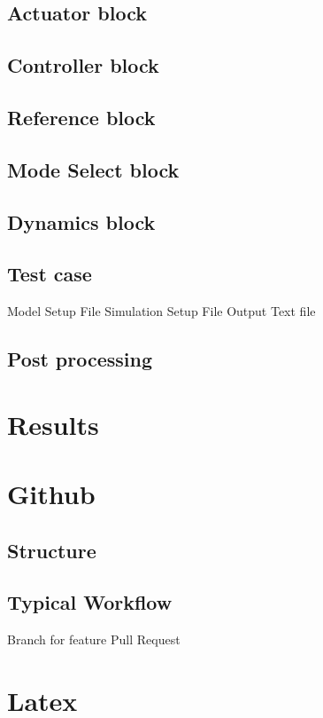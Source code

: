 \subsection{Actuator block} %
\subsection{Controller block} %
\subsection{Reference block} %
\subsection{Mode Select block} %
\subsection{Dynamics block}
\subsection{Test case}
Model Setup File
Simulation Setup File
Output Text file

\subsection{Post processing}


\section{Results}


\appendix
\section{Github}
\subsection{Structure}
\subsection{Typical Workflow}
Branch for feature
Pull Request

\section{Latex}

\section{}
